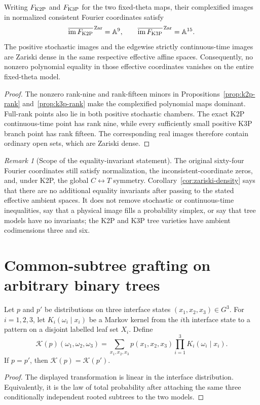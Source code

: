 \documentclass[11pt]{article}
\theoremstyle{remark}\newtheorem{remark}[theorem]{Remark}
\begin{document}
\begin{corollary}\label{cor:zariski-density}
Writing $F_{\mathrm{K2P}}$ and $F_{\mathrm{K3P}}$ for the two fixed-theta maps, their complexified images in normalized consistent Fourier coordinates satisfy
\[
\overline{\operatorname{im}F_{\mathrm{K2P}}}^{\,\mathrm{Zar}}=\mathbb A^9,
\qquad
\overline{\operatorname{im}F_{\mathrm{K3P}}}^{\,\mathrm{Zar}}=\mathbb A^{15}.
\]
The positive stochastic images and the edgewise strictly continuous-time images are Zariski dense in the same respective effective affine spaces. Consequently, no nonzero polynomial equality in those effective coordinates vanishes on the entire fixed-theta model.
\end{corollary}
\begin{proof}
The nonzero rank-nine and rank-fifteen minors in Propositions~\ref{prop:k2p-rank} and~\ref{prop:k3p-rank} make the complexified polynomial maps dominant. Full-rank points also lie in both positive stochastic chambers. The exact K2P continuous-time point has rank nine, while every sufficiently small positive K3P branch point has rank fifteen. The corresponding real images therefore contain ordinary open sets, which are Zariski dense.
\end{proof}
\begin{remark}[Scope of the equality-invariant statement]
The original sixty-four Fourier coordinates still satisfy normalization, the inconsistent-coordinate zeros, and, under K2P, the global $C\leftrightarrow T$ symmetry. Corollary~\ref{cor:zariski-density} says that there are no additional equality invariants after passing to the stated effective ambient spaces. It does not remove stochastic or continuous-time inequalities, say that a physical image fills a probability simplex, or say that tree models have no invariants; the K2P and K3P tree varieties have ambient codimensions three and six.
\end{remark}

\section{Common-subtree grafting on arbitrary binary trees}\label{sec:grafting}
\begin{lemma}\label{lem:common-kernel}
Let $p$ and $p'$ be distributions on three interface states $(x_1,x_2,x_3)\in G^3$. For $i=1,2,3$, let $K_i(\omega_i\mid x_i)$ be a Markov kernel from the $i$th interface state to a pattern on a disjoint labelled leaf set $X_i$. Define
\[
\mathcal K(p)(\omega_1,\omega_2,\omega_3)
=\sum_{x_1,x_2,x_3}p(x_1,x_2,x_3)\prod_{i=1}^3K_i(\omega_i\mid x_i).
\]
If $p=p'$, then $\mathcal K(p)=\mathcal K(p')$.
\end{lemma}
\begin{proof}
The displayed transformation is linear in the interface distribution. Equivalently, it is the law of total probability after attaching the same three conditionally independent rooted subtrees to the two models.
\end{proof}
\end{document}
